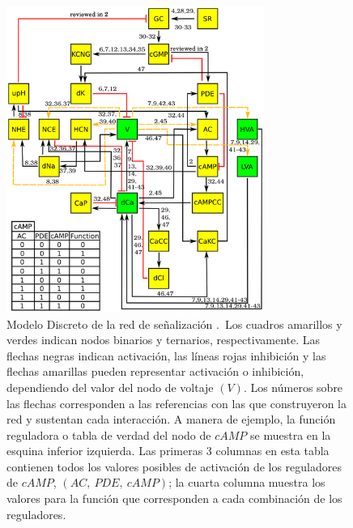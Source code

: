 \begin{figure}[hbt]
\includegraphics[width=0.9\linewidth,height=10cm]{gfx/redErizoModelo}
\caption[Modelo Discreto de la red de se\~nalizaci\'on]{Modelo Discreto de la red de se\~nalizaci\'on \citeauthor{Espinal2011} \citep{Espinal2011}.\ Los cuadros amarillos y verdes indican nodos binarios y ternarios, respectivamente. Las flechas negras indican activación, las líneas rojas inhibición y las flechas amarillas pueden representar activación o inhibición, dependiendo del valor del nodo de voltaje $(V)$. Los números sobre las flechas corresponden a las referencias con las que \citeauthor{Espinal2011} \citep{Espinal2011} construyeron la red y sustentan cada interacción. A manera de ejemplo, la función reguladora o tabla de verdad del nodo de $cAMP$ se muestra en la esquina inferior izquierda. Las primeras 3 columnas en esta tabla contienen todos los valores posibles de activación de los reguladores de $cAMP$, $(AC,\ PDE,\ cAMP)$; la cuarta columna muestra los valores para la función que corresponden a cada combinación de los reguladores.}\label{fig:erizoModelo}
\end{figure}


